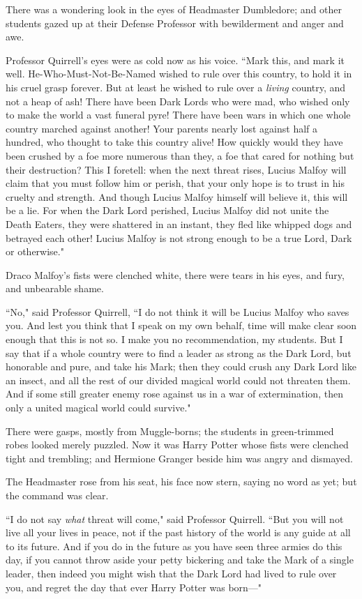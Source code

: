 There was a wondering look in the eyes of Headmaster Dumbledore; and other students gazed up at their Defense Professor with bewilderment and anger and awe.

Professor Quirrell's eyes were as cold now as his voice. ``Mark this, and mark it well. He-Who-Must-Not-Be-Named wished to rule over this country, to hold it in his cruel grasp forever. But at least he wished to rule over a \emph{living} country, and not a heap of ash! There have been Dark Lords who were mad, who wished only to make the world a vast funeral pyre! There have been wars in which one whole country marched against another! Your parents nearly lost against half a hundred, who thought to take this country alive! How quickly would they have been crushed by a foe more numerous than they, a foe that cared for nothing but their destruction? This I foretell: when the next threat rises, Lucius Malfoy will claim that you must follow him or perish, that your only hope is to trust in his cruelty and strength. And though Lucius Malfoy himself will believe it, this will be a lie. For when the Dark Lord perished, Lucius Malfoy did not unite the Death Eaters, they were shattered in an instant, they fled like whipped dogs and betrayed each other! Lucius Malfoy is not strong enough to be a true Lord, Dark or otherwise."

Draco Malfoy's fists were clenched white, there were tears in his eyes, and fury, and unbearable shame.

``No," said Professor Quirrell, ``I do not think it will be Lucius Malfoy who saves you. And lest you think that I speak on my own behalf, time will make clear soon enough that this is not so. I make you no recommendation, my students. But I say that if a whole country were to find a leader as strong as the Dark Lord, but honorable and pure, and take his Mark; then they could crush any Dark Lord like an insect, and all the rest of our divided magical world could not threaten them. And if some still greater enemy rose against us in a war of extermination, then only a united magical world could survive."

There were gasps, mostly from Muggle-borns; the students in green-trimmed robes looked merely puzzled. Now it was Harry Potter whose fists were clenched tight and trembling; and Hermione Granger beside him was angry and dismayed.

The Headmaster rose from his seat, his face now stern, saying no word as yet; but the command was clear.

``I do not say \emph{what} threat will come," said Professor Quirrell. ``But you will not live all your lives in peace, not if the past history of the world is any guide at all to its future. And if you do in the future as you have seen three armies do this day, if you cannot throw aside your petty bickering and take the Mark of a single leader, then indeed you might wish that the Dark Lord had lived to rule over you, and regret the day that ever Harry Potter was born—"

